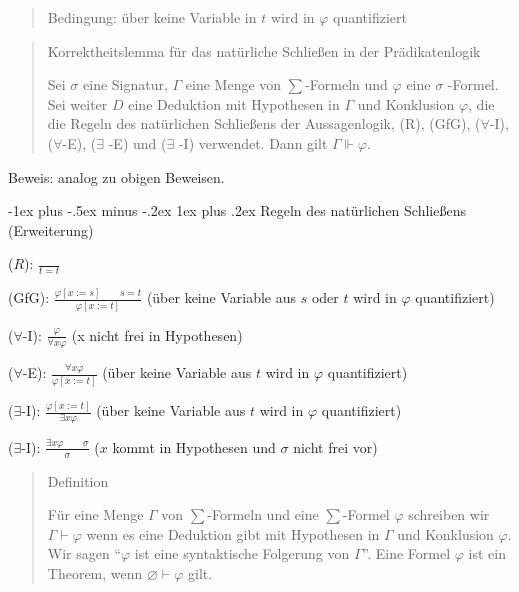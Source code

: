 \documentclass[a4paper]{article}
\makeatletter
\renewcommand{\subsubsection}{\@startsection{subsubsection}{3}{0mm}%
                {-1ex plus -.5ex minus -.2ex}%
                {1ex plus .2ex}%
                {\normalfont\small\bfseries}}
\makeatother
\begin{document}
\begin{multicols}{3}
\begin{quote}
    Bedingung: über keine Variable in $t$ wird in $\varphi$ quantifiziert
  \end{quote}

  \begin{quote}
    Korrektheitslemma für das natürliche Schließen in der Prädikatenlogik

    Sei $\sigma$ eine Signatur, $\Gamma$ eine Menge von $\sum$-Formeln und
    $\varphi$ eine $\sigma$ -Formel. Sei weiter $D$ eine Deduktion mit
    Hypothesen in $\Gamma$ und Konklusion $\varphi$, die die Regeln des
    natürlichen Schließens der Aussagenlogik, (R), (GfG), ($\forall$-I),
    ($\forall$-E), ($\exists$ -E) und ($\exists$ -I) verwendet. Dann gilt
    $\Gamma\Vdash\varphi$.
  \end{quote}

  Beweis: analog zu obigen Beweisen.

  \subsubsection{Regeln des natürlichen Schließens
    (Erweiterung)}\label{regeln-des-natuxfcrlichen-schlieuxdfens-erweiterung}

  \begin{itemize*}
    \itemsep1pt\parskip0pt
    \item
          ($R$): $\frac{}{t=t}$
    \item
          (GfG): $\frac{\varphi[x:=s] \quad\quad s=t}{\varphi[x:=t]}$ (über
          keine Variable aus $s$ oder $t$ wird in $\varphi$ quantifiziert)
    \item
          ($\forall$-I): $\frac{\varphi}{\forall x\varphi}$ (x nicht frei in
          Hypothesen)
    \item
          ($\forall$-E): $\frac{\forall x\varphi}{\varphi[x:=t]}$ (über keine
          Variable aus $t$ wird in $\varphi$ quantifiziert)
    \item
          ($\exists$-I): $\frac{\varphi [x:=t]}{\exists x\varphi}$ (über keine
          Variable aus $t$ wird in $\varphi$ quantifiziert)
    \item
          ($\exists$-I): $\frac{\exists x\varphi\quad\quad \sigma}{\sigma}$ ($x$
          kommt in Hypothesen und $\sigma$ nicht frei vor)
  \end{itemize*}

  \begin{quote}
    Definition

    Für eine Menge $\Gamma$ von $\sum$-Formeln und eine $\sum$-Formel
    $\varphi$ schreiben wir $\Gamma\vdash\varphi$ wenn es eine Deduktion
    gibt mit Hypothesen in $\Gamma$ und Konklusion $\varphi$. Wir sagen
    ``$\varphi$ ist eine syntaktische Folgerung von $\Gamma$''. Eine Formel
    $\varphi$ ist ein Theorem, wenn $\varnothing\vdash\varphi$ gilt.
  \end{quote}


\end{multicols}
\end{document}
